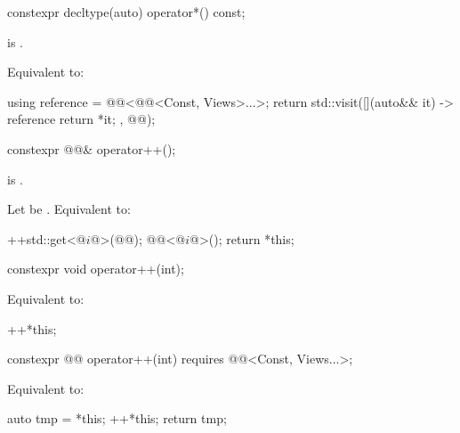 %
\begin{itemdecl}
constexpr decltype(auto) operator*() const;
\end{itemdecl}

\begin{itemdescr}
\pnum
\expects
{} is .

\pnum
\effects
Equivalent to:
\begin{codeblock}
using reference = @@<@@<Const, Views>...>;
return std::visit([](auto&& it) -> reference { return *it; },
                  @@);
\end{codeblock}
\end{itemdescr}

%
\begin{itemdecl}
constexpr @@& operator++();
\end{itemdecl}

\begin{itemdescr}
\pnum
\expects
{} is .

\pnum
\effects
Let  be .
Equivalent to:
\begin{codeblock}
++std::get<@$i$@>(@@);
@@<@$i$@>();
return *this;
\end{codeblock}
\end{itemdescr}

%
\begin{itemdecl}
constexpr void operator++(int);
\end{itemdecl}

\begin{itemdescr}
\pnum
\effects
Equivalent to:
\begin{codeblock}
++*this;
\end{codeblock}
\end{itemdescr}

%
\begin{itemdecl}
constexpr @@ operator++(int)
  requires @@<Const, Views...>;
\end{itemdecl}

\begin{itemdescr}
\pnum
\effects
Equivalent to:
\begin{codeblock}
auto tmp = *this;
++*this;
return tmp;
\end{codeblock}
\end{itemdescr}

